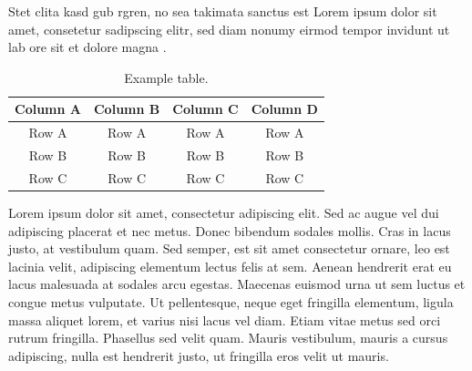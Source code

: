 \textcite{nelson88,moore91} Stet clita kasd gub rgren, no sea takimata sanctus est Lorem ipsum dolor sit amet, consetetur sadipscing elitr, sed diam nonumy eirmod tempor invidunt ut lab ore sit et dolore magna \parencite{unesco}. 

\vspace{6pt} %
\begin{table}[!ht]
\centering
\setlength{\tabcolsep}{14pt}
\caption{Example table.}
\begin{tabular}{cccc}
\toprule\midrule
Column A & Column B & Column C & Column D \\
\midrule
Row A & Row A & Row A & Row A \\
Row B & Row B & Row B & Row B \\
Row C & Row C & Row C & Row C \\
\bottomrule
\end{tabular}
\label{table:ch4-1}
\end{table}
\vspace{-6pt} %

Lorem ipsum dolor sit amet, consectetur adipiscing elit. Sed ac augue vel dui  adipiscing placerat et nec metus. Donec bibendum sodales mollis. Cras in lacus  justo, at vestibulum quam. Sed semper, est sit amet consectetur ornare, leo est  lacinia velit, adipiscing elementum lectus felis at sem. Aenean hendrerit erat eu  lacus malesuada at sodales arcu egestas. Maecenas euismod urna ut sem luctus et  congue metus vulputate. Ut pellentesque, neque eget fringilla elementum, ligula  massa aliquet lorem, et varius nisi lacus vel diam. Etiam vitae metus sed orci  rutrum fringilla. Phasellus sed velit quam. Mauris vestibulum, mauris a cursus  adipiscing, nulla est hendrerit justo, ut fringilla eros velit ut mauris.